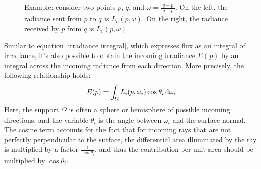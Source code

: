 \begin{figure}[H]
\begin{tikzpicture}[x=0.75pt,y=0.75pt,yscale=-1,xscale=1]
\end{tikzpicture}

\caption{Example: consider two points $p$, $q$, and $\omega=\frac{q-p}{|q-p|}$. On the left, the radiance sent from $p$ to $q$ is $L_o(p,\omega)$. On the right, the radiance received by $p$ from $q$ is $L_i(p,\omega)$.}
\end{figure}
Similar to equation \ref{irradiance integral}, which expresses flux as an integral of irradiance, it's also possible to obtain the incoming irradiance $E(p)$ by an integral across the incoming radiance from each direction. More precisely, the following relationship holds:
\begin{align}
    E(p) = \int_\Omega L_i(p,\omega_i)\cos\theta_i\d\omega_i
    \label{radiance integral}
\end{align}
Here, the support $\Omega$ is often a sphere or hemisphere of possible incoming directions, and the variable $\theta_i$ is the angle between $\omega_i$ and the surface normal. The cosine term accounts for the fact that for incoming rays that are not perfectly perpendicular to the surface, the differential area illuminated by the ray is multiplied by a factor $\frac{1}{\cos\theta_i}$, and thus the contribution per unit area should be multiplied by $\cos\theta_i$. 
